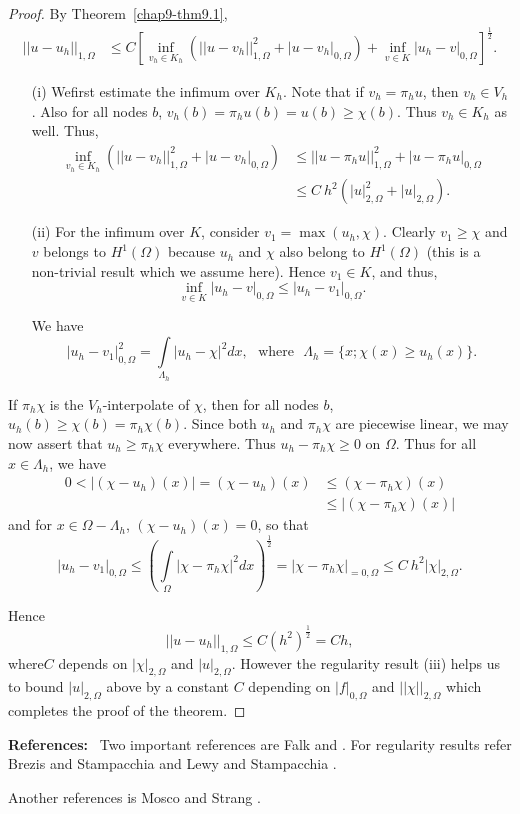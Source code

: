 \begin{proof}
By Theorem~\ref{chap9-thm9.1},
\begin{align*}
||u-u_{h}||_{1,\Omega} &\leq C\left[\inf\limits_{v_{h}\in
    K_{h}}\left(||u-v_{h}||^{2}_{1,\Omega}+|u-v_{h}|_{0,\Omega}\right)+\inf\limits_{v\in K}|u_{h}-v|_{0,\Omega}\right]^{\frac{1}{2}}.
\end{align*}

\begin{itemize}
\item[(i)] We\pageoriginale first estimate the infimum over
  $K_{h}$. Note that if $v_{h}=\pi_{h}u$, then $v_{h}\in V_{h}$. Also
  for all nodes $b$, $v_{h}(b)=\pi_{h}u(b)=u(b)\geq \chi (b)$. Thus
  $v_{h}\in K_{h}$ as well. Thus,
\begin{align*}
\inf\limits_{v_{h}\in
  K_{h}}\left(||u-v_{h}||^{2}_{1,\Omega}+|u-v_{h}|_{0,\Omega}\right)
&\leq ||u-\pi_{h}u||^{2}_{1,\Omega}+|u-\pi_{h}u|_{0,\Omega}\\
&\leq C\ h^{2}\left(|u|^{2}_{2,\Omega}+|u|_{2,\Omega}\right).
\end{align*}

\item[(ii)] For the infimum over $K$, consider $v_{1}=\max
  (u_{h},\chi)$. Clearly $v_{1}\geq \chi$ and $v$ belongs to
  $H^{1}(\Omega)$ because $u_{h}$ and $\chi$ also belong to
  $H^{1}(\Omega)$ (this is a non-trivial result which we assume
  here). Hence $v_{1}\in K$, and thus,
$$
\inf\limits_{v\in K}|u_{h}-v|_{0,\Omega}\leq |u_{h}-v_{1}|_{0,\Omega}.
$$

We have
$$
|u_{h}-v_{1}|^{2}_{0,\Omega}=\int\limits_{\Lambda_{h}}|u_{h}-\chi|^{2}dx,\text{~
  where~ } \Lambda_{h}=\{x;\chi(x)\geq u_{h}(x)\}.
$$
\end{itemize}

If $\pi_{h}\chi$ is the $V_{h}$-interpolate of $\chi$, then for all
nodes $b$, $u_{h}(b)\geq \chi(b)=\pi_{h}\chi(b)$. Since both $u_{h}$
and $\pi_{h}\chi$ are piecewise linear, we may now assert that
$u_{h}\geq \pi_{h}\chi$ everywhere. Thus $u_{h}-\pi_{h}\chi\geq 0$ on
$\Omega$. Thus for all $x\in \Lambda_{h}$, we have
\begin{align*}
0<|(\chi-u_{h})(x)|=(\chi-u_{h})(x) &\leq (\chi-\pi_{h}\chi)(x)\\
&\leq |(\chi-\pi_{h}\chi)(x)|
\end{align*}
and for $x\in \Omega-\Lambda_{h}$, $(\chi-u_{h})(x)=0$, so that
$$
|u_{h}-v_{1}|_{0,\Omega}\leq
\left(\int\limits_{\Omega}|\chi-\pi_{h}\chi|^{2}dx\right)^{\frac{1}{2}}=|\chi-\pi_{h}\chi|_{=0,\Omega}\leq
C\ h^{2}|\chi|_{2,\Omega}. 
$$

Hence
$$
||u-u_{h}||_{1,\Omega}\leq C(h^{2})^{\frac{1}{2}}=Ch,
$$
where\pageoriginale $C$ depends on $|\chi|_{2,\Omega}$ and
$|u|_{2,\Omega}$. However the regularity result (iii) helps us to
bound $|u|_{2,\Omega}$ above by a constant $C$ depending on
$|f|_{0,\Omega}$ and $||\chi||_{2,\Omega}$ which completes the proof
of the theorem.
\end{proof}

\noindent
{\bf References:}~ Two important references are Falk \cite{key11} and
\cite{key12}. For regularity results refer Brezis and Stampacchia
\cite{key3} and Lewy and Stampacchia \cite{key16}. 

Another references is Mosco and Strang \cite{key19}.



